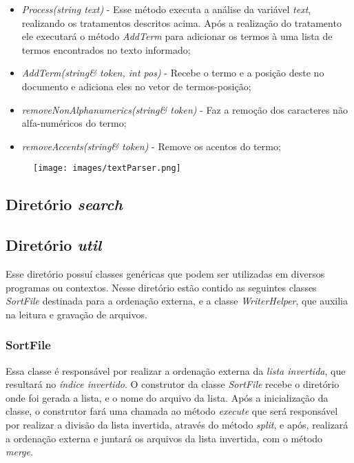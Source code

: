 \documentclass[12pt]{article}
\begin{document}
\begin{itemize}
\item \textit{Process(string text)} - Esse método executa a análise da variável \textit{text}, realizando os tratamentos descritos acima. Após a realização do tratamento ele executará o método \textit{AddTerm} para adicionar os termos à uma lista de termos encontrados no texto informado;
\item \textit{AddTerm(string\& token, int pos)} - Recebe o termo e a posição deste no documento e adiciona eles no vetor de termos-posição;
\item \textit{removeNonAlphanumerics(string\& token)} - Faz a remoção dos caracteres não alfa-numéricos do termo;
\item \textit{removeAccents(string\& token)} - Remove os acentos do termo;
\end{itemize}

\begin{figure}[ht]
\centering
\texttt{[image: images/textParser.png]}
\label{fig:textParser}
\end{figure}

\subsection{Diretório \textit{search}} \label{ssec:search}
\subsection{Diretório \textit{util}} \label{ssec:util}

Esse diretório possuí classes genéricas que podem ser utilizadas em diversos programas ou contextos. Nesse diretório estão contido as seguintes classes \textit{SortFile} destinada para a ordenação externa, e a classe \textit{WriterHelper}, que auxilia na leitura e gravação de arquivos.

\subsubsection{SortFile} \label{sssec:sortfile}

Essa classe é responsável por realizar a ordenação externa da \textit{lista invertida}, que resultará no \textit{índice invertido}. O construtor da classe \textit{SortFile} recebe o diretório onde foi gerada a lista, e o nome do arquivo da lista. Após a inicialização da classe, o construtor fará uma chamada ao método \textit{execute} que será responsável por realizar a divisão da lista invertida, através do método \textit{split}, e após, realizará a ordenação externa e juntará os arquivos da lista invertida, com o método \textit{merge}.
\end{document}
